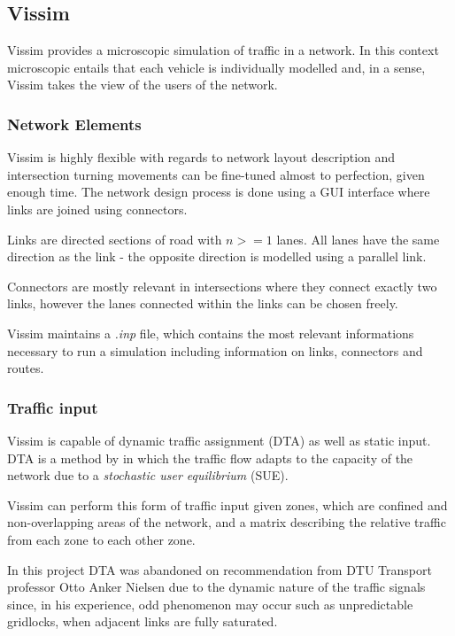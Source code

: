 \subsection{Vissim}
\label{vissim}
Vissim provides a microscopic simulation of traffic in a network. In this context microscopic entails that each vehicle is individually modelled and, in a sense, Vissim takes the view of the users of the network.

\subsubsection{Network Elements}

Vissim is highly flexible with regards to network layout description and intersection turning movements can be fine-tuned almost to perfection, given enough time. The network design process is done using a GUI interface where links are joined using connectors.

Links are directed sections of road with $n>=1$ lanes. All lanes have the same direction as the link - the opposite direction is modelled using a parallel link.

Connectors are mostly relevant in intersections where they connect exactly two links, however the lanes connected within the links can be chosen freely.

Vissim maintains a \textit{.inp} file, which contains the most relevant informations necessary to run a simulation including information on links, connectors and routes. 

\subsubsection{Traffic input}
Vissim is capable of dynamic traffic assignment (DTA) as well as static input. DTA is a method by \cite{Wardrop} in which the traffic flow adapts to the capacity of the network due to a \textit{stochastic user equilibrium} (SUE). 

Vissim can perform this form of traffic input given zones, which are confined and non-overlapping areas of the network, and a matrix describing the relative traffic from each zone to each other zone.

In this project DTA was abandoned on recommendation from DTU Transport professor Otto Anker Nielsen due to the dynamic nature of the traffic signals since, in his experience, odd phenomenon may occur such as unpredictable gridlocks, when adjacent links are fully saturated.

